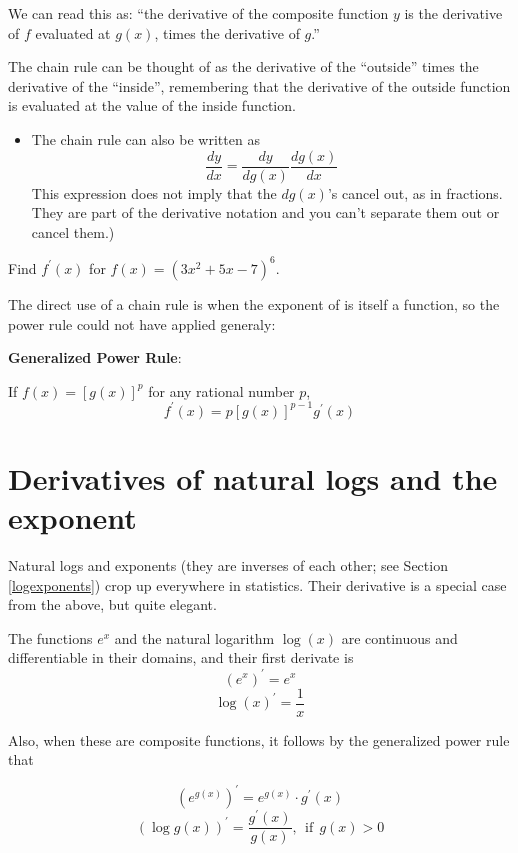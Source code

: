 \documentclass[]{book}
\providecommand{\tightlist}{%
  \setlength{\itemsep}{0pt}\setlength{\parskip}{0pt}}
\theoremstyle{definition}
\theoremstyle{definition}
\theoremstyle{definition}
\theoremstyle{remark}
\let\BeginKnitrBlock\begin \let\EndKnitrBlock\end
\begin{document}
We can read this as: ``the derivative of the composite function \(y\) is
the derivative of \(f\) evaluated at \(g(x)\), times the derivative of
\(g\).''

The chain rule can be thought of as the derivative of the ``outside''
times the derivative of the ``inside'', remembering that the derivative
of the outside function is evaluated at the value of the inside
function.

\begin{itemize}
\tightlist
\item
  The chain rule can also be written as
  \[\frac{dy}{dx}=\frac{dy}{dg(x)} \frac{dg(x)}{dx}\] This expression
  does not imply that the \(dg(x)\)'s cancel out, as in fractions. They
  are part of the derivative notation and you can't separate them out or
  cancel them.)
\end{itemize}

\BeginKnitrBlock{example}[Composite Exponent]
\protect\hypertarget{exm:tothesix}{}{\label{exm:tothesix}
{} }Find \(f^\prime(x)\) for
\(f(x) = (3x^2+5x-7)^6\).
\EndKnitrBlock{example}

The direct use of a chain rule is when the exponent of is itself a
function, so the power rule could not have applied generaly:

\textbf{Generalized Power Rule}:

If \(f(x)=[g(x)]^p\) for any rational number \(p\),
\[f^\prime(x) =p[g(x)]^{p-1}g^\prime(x)\]

\section{Derivatives of natural logs and the
exponent}\label{derivatives-of-natural-logs-and-the-exponent}

Natural logs and exponents (they are inverses of each other; see Section
\ref{logexponents}) crop up everywhere in statistics. Their derivative
is a special case from the above, but quite elegant.

\BeginKnitrBlock{theorem}
\protect\hypertarget{thm:derivexplog}{}{\label{thm:derivexplog} } The
functions \(e^x\) and the natural logarithm \(\log(x)\) are continuous
and differentiable in their domains, and their first derivate is
\[(e^x)^\prime = e^x\] \[\log(x)^\prime = \frac{1}{x}\]

Also, when these are composite functions, it follows by the generalized
power rule that

\[\left(e^{g(x)}\right)^\prime = e^{g(x)} \cdot g^\prime(x)\]
\[\left(\log g(x)\right)^\prime = \frac{g^\prime(x)}{g(x)}, ~~\text{if}~~ g(x) > 0\]
\EndKnitrBlock{theorem}
\end{document}
